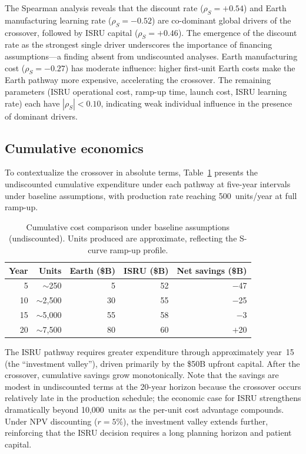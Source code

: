 \documentclass[preprint,12pt]{elsarticle}
\begin{document}
The Spearman analysis reveals that the discount rate ($\rho_S = +0.54$) and Earth manufacturing learning rate ($\rho_S = -0.52$) are co-dominant global drivers of the crossover, followed by ISRU capital ($\rho_S = +0.46$). The emergence of the discount rate as the strongest single driver underscores the importance of financing assumptions---a finding absent from undiscounted analyses. Earth manufacturing cost ($\rho_S = -0.27$) has moderate influence: higher first-unit Earth costs make the Earth pathway more expensive, accelerating the crossover. The remaining parameters (ISRU operational cost, ramp-up time, launch cost, ISRU learning rate) each have $|\rho_S| < 0.10$, indicating weak individual influence in the presence of dominant drivers.

\subsection{Cumulative economics}

To contextualize the crossover in absolute terms, Table~\ref{tab:cumulative} presents the undiscounted cumulative expenditure under each pathway at five-year intervals under baseline assumptions, with production rate reaching 500~units/year at full ramp-up.

\begin{table}[htbp]
\centering
\caption{Cumulative cost comparison under baseline assumptions (undiscounted). Units produced are approximate, reflecting the S-curve ramp-up profile.}
\label{tab:cumulative}
\begin{tabular}{@{}rrrrr@{}}
\toprule
Year & Units & Earth (\$B) & ISRU (\$B) & Net savings (\$B) \\
\midrule
5  & $\sim$250   & 5   & 52  & $-$47  \\
10 & $\sim$2{,}500 & 30  & 55  & $-$25  \\
15 & $\sim$5{,}000 & 55  & 58  & $-$3   \\
20 & $\sim$7{,}500 & 80  & 60  & $+$20  \\
\bottomrule
\end{tabular}
\end{table}

The ISRU pathway requires greater expenditure through approximately year~15 (the ``investment valley''), driven primarily by the \$50B upfront capital. After the crossover, cumulative savings grow monotonically. Note that the savings are modest in undiscounted terms at the 20-year horizon because the crossover occurs relatively late in the production schedule; the economic case for ISRU strengthens dramatically beyond 10{,}000~units as the per-unit cost advantage compounds. Under NPV discounting ($r = 5\%$), the investment valley extends further, reinforcing that the ISRU decision requires a long planning horizon and patient capital.
\end{document}
